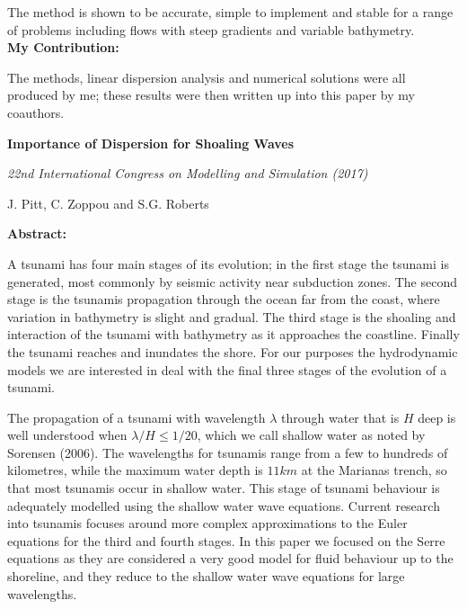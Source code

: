 The method is shown to be accurate, simple to implement and stable for a range of problems including flows with steep gradients and variable bathymetry. \\
\textbf{My Contribution:}

The methods, linear dispersion analysis and numerical solutions were all produced by me; these results were then written up into this paper by my coauthors. 

\vspace*{\baselineskip}
\begin{center}
	\textbf{
		\Large Importance of Dispersion for Shoaling Waves}
	
	\vspace*{\baselineskip}
	
	\textit{22nd International Congress on Modelling and Simulation (2017)}
	
	{J. Pitt, C. Zoppou and S.G. Roberts}
	\vspace*{0.5\baselineskip}
\end{center}
\textbf{Abstract:}

A tsunami has four main stages of its evolution; in the first stage the tsunami is generated, most commonly by seismic activity near subduction zones. The second stage is the tsunamis propagation through the ocean far from the coast, where variation in bathymetry is slight and gradual. The third stage is the shoaling and interaction of the tsunami with bathymetry as it approaches the coastline. Finally the tsunami reaches and inundates the shore. For our purposes the hydrodynamic models we are interested in deal with the final three stages of the evolution of a tsunami.

The propagation of a tsunami with wavelength $\lambda$ through water that is $H$ deep is well understood when $\lambda / H \le 1/ 20$, which we call shallow water as noted by Sorensen (2006). The wavelengths for tsunamis range from a few to hundreds of kilometres, while the maximum water depth is $11km$ at the Marianas trench, so that most tsunamis occur in shallow water. This stage of tsunami behaviour is adequately modelled using the shallow water wave equations. Current research into tsunamis focuses around more complex approximations to the Euler equations for the third and fourth stages. In this paper we focused on the Serre equations as they are considered a very good model for fluid behaviour up to the shoreline, and they reduce to the shallow water wave equations for large wavelengths. 


